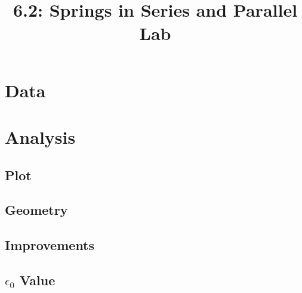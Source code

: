 \documentclass{article}
\title{6.2: Springs in Series and Parallel Lab}
\begin{document}
\section{Data}
\section{Analysis}
\subsection{Plot}
\subsection{Geometry}
\subsection{Improvements}
\subsection{$\epsilon_0$ Value}
\end{document}
